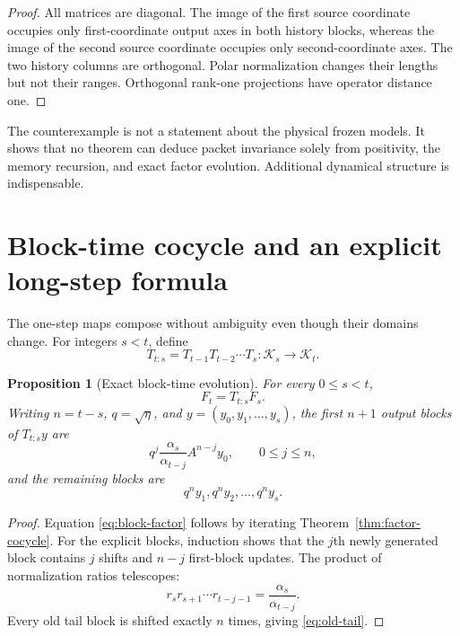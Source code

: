 \documentclass[12pt]{article}
\newtheorem{proposition}[theorem]{Proposition}
\theoremstyle{definition}
\theoremstyle{remark}
\newcommand{\cK}{\mathcal K}
\begin{document}
\begin{proof}
All matrices are diagonal.  The image of the first source coordinate occupies
only first-coordinate output axes in both history blocks, whereas the image
of the second source coordinate occupies only second-coordinate axes.  The
two history columns are orthogonal.  Polar normalization changes their
lengths but not their ranges.  Orthogonal rank-one projections have operator
distance one.
\end{proof}

The counterexample is not a statement about the physical frozen models.  It
shows that no theorem can deduce packet invariance solely from positivity,
the memory recursion, and exact factor evolution.  Additional dynamical
structure is indispensable.

\section{Block-time cocycle and an explicit long-step formula}

The one-step maps compose without ambiguity even though their domains change.
For integers $s<t$, define
\[
 T_{t:s}=T_{t-1}T_{t-2}\cdots T_s:\cK_s\to\cK_t.
\]

\begin{proposition}[Exact block-time evolution]\label{prop:block-time}
For every $0\le s<t$,
\begin{equation}\label{eq:block-factor}
 F_t=T_{t:s}F_s.
\end{equation}
Writing $n=t-s$, $q=\sqrt\eta$, and
$y=(y_0,y_1,\ldots,y_s)$, the first $n+1$ output blocks of $T_{t:s}y$ are
\begin{equation}\label{eq:block-formula}
 q^j\frac{\alpha_s}{\alpha_{t-j}}A^{n-j}y_0,
 \qquad 0\le j\le n,
\end{equation}
and the remaining blocks are
\begin{equation}\label{eq:old-tail}
 q^ny_1,q^ny_2,\ldots,q^ny_s.
\end{equation}
\end{proposition}

\begin{proof}
Equation \eqref{eq:block-factor} follows by iterating
Theorem~\ref{thm:factor-cocycle}.  For the explicit blocks, induction shows
that the $j$th newly generated block contains $j$ shifts and $n-j$ first-block
updates.  The product of normalization ratios telescopes:
\[
 r_s r_{s+1}\cdots r_{t-j-1}
 =\frac{\alpha_s}{\alpha_{t-j}}.
\]
Every old tail block is shifted exactly $n$ times, giving
\eqref{eq:old-tail}.
\end{proof}
\end{document}
